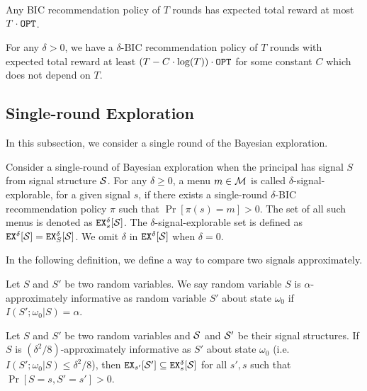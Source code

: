 \begin{claim}
Any BIC recommendation policy of $T$ rounds has expected total reward at most $T \cdot\OPT$.
\end{claim}

\begin{theorem}
\label{thm:private_nocc}
For any $\delta > 0$, we have a $\delta$-BIC recommendation policy of $T$ rounds with expected total reward at least $\left(T - C\cdot \log(T) \right) \cdot \OPT$ for some constant $C$ which does not depend on $T$.
\end{theorem}


\subsection{Single-round Exploration}
\label{sec:private_single}

In this subsection, we consider a single round of the Bayesian exploration.

\begin{definition}
Consider a single-round of Bayesian exploration when the principal has signal $S$ from signal structure $\S$. For any $\delta \geq 0$, a menu $m \in \M$ is called $\delta$-signal-explorable, for a given signal $s$, if there exists a single-round $\delta$-BIC recommendation policy $\pi$ such that $\Pr[\pi(s) = m] > 0$. The set of all such menus is denoted as $\EX^{\delta}_s[\S]$. The $\delta$-signal-explorable set is defined as $\EX^{\delta}[\S] = \EX^{\delta}_S[\S]$. We omit $\delta$ in $\EX^{\delta}[\S]$ when $\delta = 0$.
\end{definition}

In the following definition, we define a way to compare two signals approximately.
\begin{definition}
Let $S$ and $S'$ be two random variables. We say random variable $S$ is $\alpha$-approximately informative as random variable $S'$ about state $\omega_0$ if $I(S' ; \omega_0|S) = \alpha$.
\end{definition}

\begin{lemma}
\label{lem:ainfomono}
Let $S$ and $S'$ be two random variables and $\S$ and $\S'$ be their signal structures. If $S$ is $(\delta^2/8)$-approximately informative as $S'$ about state $\omega_0$ (i.e. $I(S' ; \omega_0|S) \leq \delta^2/8$), then $\EX_{s'}[\S'] \subseteq \EX^{\delta}_s[\S]$  for all $s' ,s$ such that $\Pr[S= s, S'= s'] > 0$.
\end{lemma}

